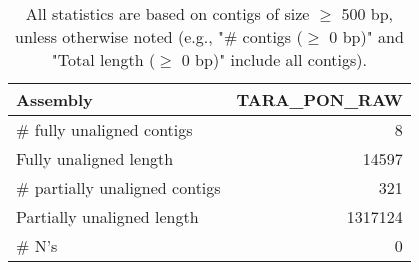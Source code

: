 \documentclass[12pt,a4paper]{article}
\begin{document}
\begin{table}[ht]
\begin{center}
\caption{All statistics are based on contigs of size $\geq$ 500 bp, unless otherwise noted (e.g., "\# contigs ($\geq$ 0 bp)" and "Total length ($\geq$ 0 bp)" include all contigs).}
\begin{tabular}{|l*{1}{|r}|}
\hline
Assembly & TARA\_PON\_RAW \\ \hline
\# fully unaligned contigs & 8 \\ \hline
Fully unaligned length & 14597 \\ \hline
\# partially unaligned contigs & 321 \\ \hline
Partially unaligned length & 1317124 \\ \hline
\# N's & 0 \\ \hline
\end{tabular}
\end{center}
\end{table}
\end{document}
